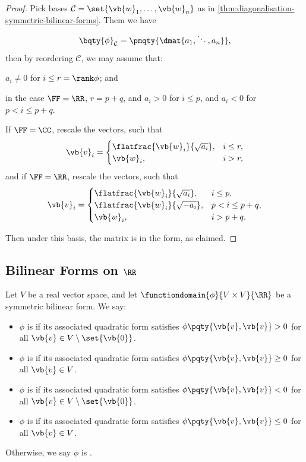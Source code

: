 \begin{proof}
    Pick bases \(\mathcal{C} = \set{\vb{w}_1, \ldots, \vb{w}_n}\) as in \autoref{thm:diagonalisation-symmetric-bilinear-forms}. Them we have
    \[
        \bqty{\phi}_{\mathcal{C}} = \pmqty{\dmat{a_1, \ddots, a_n}},
    \]
    then by reordering \(\mathcal{C}\), we may assume that:
    \item \(a_i \neq 0\) for \(i \leq r = \rank \phi\); and
    \item in the case \(\FF = \RR\), \(r = p + q\), and \(a_i > 0\) for \(i \leq p\), and \(a_i < 0\) for \(p < i \leq p + q\).
    
    If \(\FF = \CC\), rescale the vectors, such that
    \[
        \vb{v}_i = \begin{cases}
            \flatfrac{\vb{w}_i}{\sqrt{a_i}}, & i \leq r, \\
            \vb{w}_i, & i > r,
        \end{cases}
    \]
    and if \(\FF = \RR\), rescale the vectors, such that
    \[
        \vb{v}_i = \begin{cases}
            \flatfrac{\vb{w}_i}{\sqrt{a_i}}, & i \leq p, \\
            \flatfrac{\vb{w}_i}{\sqrt{-a_i}}, & p < i \leq p + q, \\
            \vb{w}_i, & i > p + q.
        \end{cases}
    \]

    Then under this basis, the matrix is in the form, as claimed.
\end{proof}

\subsection{Bilinear Forms on \(\RR\)}

\begin{definition}
    Let \(V\) be a real vector space, and let \(\functiondomain{\phi}{V \times V}{\RR}\) be a symmetric bilinear form. We say:
    \begin{itemize}
        \item \(\phi\) is  if its associated quadratic form satisfies \(\phi\pqty{\vb{v}, \vb{v}} > 0\) for all \(\vb{v} \in V \setminus \set{\vb{0}}\).
        \item \(\phi\) is  if its associated quadratic form satisfies \(\phi\pqty{\vb{v}, \vb{v}} \geq 0\) for all \(\vb{v} \in V\).
        \item \(\phi\) is  if its associated quadratic form satisfies \(\phi\pqty{\vb{v}, \vb{v}} < 0\) for all \(\vb{v} \in V \setminus \set{\vb{0}}\).
        \item \(\phi\) is  if its associated quadratic form satisfies \(\phi\pqty{\vb{v}, \vb{v}} \leq 0\) for all \(\vb{v} \in V\).
    \end{itemize}

    Otherwise, we say \(\phi\) is .
\end{definition}

